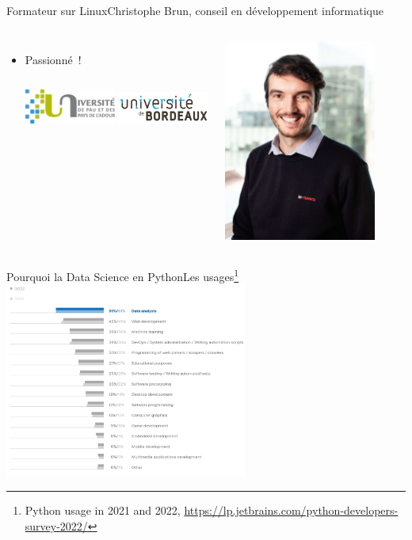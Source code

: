 \documentclass{beamer}
\begin{document}
\begin{frame}{Formateur sur Linux}{Christophe Brun, conseil en développement informatique}
\begin{columns}
\begin{itemize}
                \item Passionné~!
                \bigbreak
                \begin{columns}
                    \centering
                    \includegraphics[width=3cm]{image/logo-uppa}
                    \centering
                    \includegraphics[width=3cm]{image/logo-universite-bordeaux}
                \end{columns}
            \end{itemize}
            \centering
            \includegraphics[width=5cm]{image/trombine-christophe}
        \end{columns}
    \end{frame}
    \begin{frame}{Pourquoi la Data Science en Python}{Les usages\footnote{\label{python-usage}Python usage in 2021 and 2022, \url{https://lp.jetbrains.com/python-developers-survey-2022/}}}
        \centering
        \includegraphics[width=8cm]{image/survey-usage}
    \end{frame}
\end{document}
